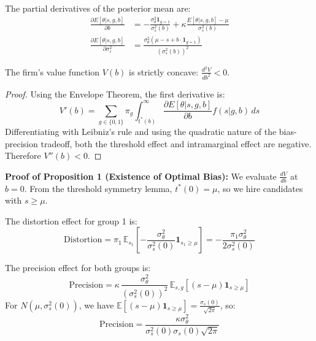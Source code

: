 \begin{lemma}
The partial derivatives of the posterior mean are:
\begin{align}
\frac{\partial E[\theta | s, g, b]}{\partial b} &= -\frac{\sigma_\theta^2 \mathbf{1}_{g=1}}{\sigma_s^2(b)} + \kappa \frac{E[\theta|s,g,b] - \mu}{\sigma_s^2(b)} \\
\frac{\partial E[\theta | s, g, b]}{\partial \sigma_\varepsilon^2} &= \frac{\sigma_\theta^2(\mu - s + b \cdot \mathbf{1}_{g=1})}{(\sigma_s^2(b))^2}
\end{align}
\end{lemma}

\begin{lemma}
The firm's value function $V(b)$ is strictly concave: $\frac{d^2V}{db^2} < 0$.
\end{lemma}
\begin{proof}
Using the Envelope Theorem, the first derivative is:
\begin{equation}
V'(b) = \sum_{g \in \{0,1\}} \pi_g \int_{t^*(b)}^\infty \frac{\partial E[\theta|s,g,b]}{\partial b} f(s|g,b) \, ds
\end{equation}
Differentiating with Leibniz's rule and using the quadratic nature of the bias-precision tradeoff, both the threshold effect and intramarginal effect are negative. Therefore $V''(b) < 0$.
\end{proof}

\textbf{Proof of Proposition 1 (Existence of Optimal Bias):} We evaluate $\frac{dV}{db}$ at $b=0$. From the threshold symmetry lemma, $t^*(0)=\mu$, so we hire candidates with $s \geq \mu$.

The distortion effect for group 1 is:
\begin{equation}
\text{Distortion} = \pi_1 \, \mathbb{E}_{s_1}\left[-\frac{\sigma_\theta^2}{\sigma_s^2(0)} \mathbf{1}_{s_1 \geq \mu}\right] = -\frac{\pi_1 \sigma_\theta^2}{2\sigma_s^2(0)}
\end{equation}

The precision effect for both groups is:
\begin{equation}
\text{Precision} = \kappa \, \frac{\sigma_\theta^2}{(\sigma_s^2(0))^2} \, \mathbb{E}_{s,g}\left[(s-\mu)\mathbf{1}_{s \geq \mu}\right]
\end{equation}
For $N(\mu,\sigma_s^2(0))$, we have $\mathbb{E}[(s-\mu)\mathbf{1}_{s \geq \mu}] = \frac{\sigma_s(0)}{\sqrt{2\pi}}$, so:
\begin{equation}
\text{Precision} = \frac{\kappa \sigma_\theta^2}{\sigma_s^2(0)\sigma_s(0)\sqrt{2\pi}}
\end{equation}


